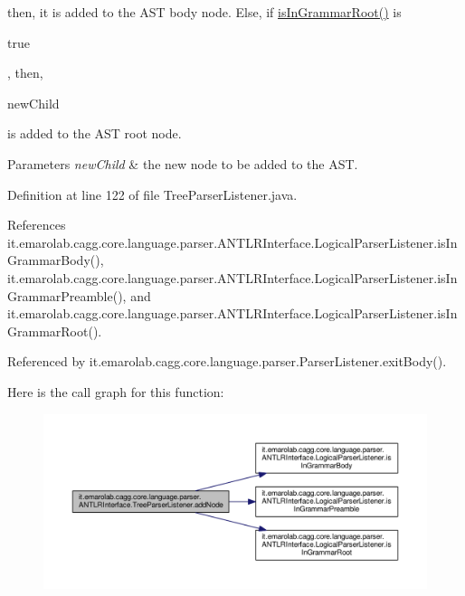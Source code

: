  then, it is added to the A\-S\-T body node. Else, if \hyperlink{classit_1_1emarolab_1_1cagg_1_1core_1_1language_1_1parser_1_1ANTLRInterface_1_1LogicalParserListener_a2fd7f67ad1ff64cb1c82b758e95505d9}{is\-In\-Grammar\-Root()} is
\begin{DoxyCode}
\textcolor{keyword}{true} 
\end{DoxyCode}
 , then,
\begin{DoxyCode}
newChild 
\end{DoxyCode}
 is added to the A\-S\-T root node. 
\begin{DoxyParams}{Parameters}
{\em new\-Child} & the new node to be added to the A\-S\-T. \\
\hline
\end{DoxyParams}


Definition at line 122 of file Tree\-Parser\-Listener.\-java.



References it.\-emarolab.\-cagg.\-core.\-language.\-parser.\-A\-N\-T\-L\-R\-Interface.\-Logical\-Parser\-Listener.\-is\-In\-Grammar\-Body(), it.\-emarolab.\-cagg.\-core.\-language.\-parser.\-A\-N\-T\-L\-R\-Interface.\-Logical\-Parser\-Listener.\-is\-In\-Grammar\-Preamble(), and it.\-emarolab.\-cagg.\-core.\-language.\-parser.\-A\-N\-T\-L\-R\-Interface.\-Logical\-Parser\-Listener.\-is\-In\-Grammar\-Root().



Referenced by it.\-emarolab.\-cagg.\-core.\-language.\-parser.\-Parser\-Listener.\-exit\-Body().



Here is the call graph for this function\-:\nopagebreak
\begin{figure}[H]
\begin{center}
\leavevmode
\includegraphics[width=350pt]{classit_1_1emarolab_1_1cagg_1_1core_1_1language_1_1parser_1_1ANTLRInterface_1_1TreeParserListener_ad3a5f8269e83644eaeeb28256a8930b7_cgraph}
\end{center}
\end{figure}


